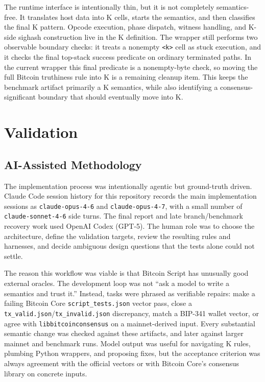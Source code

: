 \documentclass[conference]{IEEEtran}
\newcommand{\bitcoin}{Bitcoin\xspace}
\newcommand{\kcell}[1]{\texttt{<#1>}\xspace}
\begin{document}
The runtime interface is intentionally thin, but it is not completely
semantics-free.  It translates host data into K cells, starts the semantics, and
then classifies the final K pattern.  Opcode execution, phase dispatch, witness
handling, and K-side sighash construction live in the K definition.  The wrapper
still performs two observable boundary checks: it treats a nonempty \kcell{k}
cell as stuck execution, and it checks the final top-stack success predicate on
ordinary terminated paths.  In the current wrapper this final predicate is a
nonempty-byte check, so moving the full Bitcoin truthiness rule into K is a
remaining cleanup item.  This keeps the benchmark artifact primarily a K
semantics, while also identifying a consensus-significant boundary that should
eventually move into K.

\section{Validation}

\subsection{AI-Assisted Methodology}

The implementation process was intentionally agentic but ground-truth driven.
Claude Code session history for this repository records the main implementation
sessions as \texttt{claude-opus-4-6} and \texttt{claude-opus-4-7}, with a small
number of \texttt{claude-sonnet-4-6} side turns.  The final report and late
branch/benchmark recovery work used OpenAI Codex (GPT-5).  The human role was
to choose the architecture, define the validation targets, review the resulting
rules and harnesses, and decide ambiguous design questions that the tests alone
could not settle.

The reason this workflow was viable is that \bitcoin Script has unusually good
external oracles.  The development loop was not ``ask a model to write a
semantics and trust it.''  Instead, tasks were phrased as verifiable repairs:
make a failing Bitcoin Core \texttt{script\_tests.json} vector pass, close a
\texttt{tx\_valid.json}/\texttt{tx\_invalid.json} discrepancy, match a BIP-341
wallet vector, or agree with \texttt{libbitcoinconsensus} on a mainnet-derived
input.  Every substantial semantic change was checked against these artifacts,
and later against larger mainnet and benchmark runs.  Model output was useful
for navigating K rules, plumbing Python wrappers, and proposing fixes, but the
acceptance criterion was always agreement with the official vectors or with
Bitcoin Core's consensus library on concrete inputs.
\end{document}
